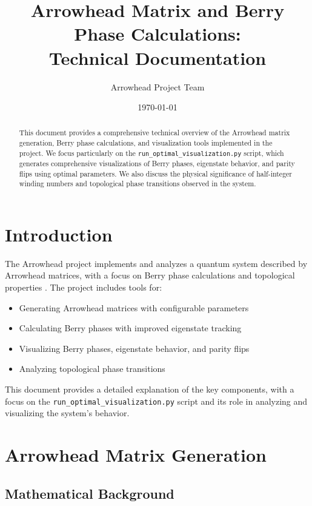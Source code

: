 \documentclass{article}
\title{Arrowhead Matrix and Berry Phase Calculations: \\
       Technical Documentation}
\author{Arrowhead Project Team}
\date{\today}
\begin{document}
\maketitle

\begin{abstract}
This document provides a comprehensive technical overview of the Arrowhead matrix generation, Berry phase calculations, and visualization tools implemented in the project. We focus particularly on the \texttt{run\_optimal\_visualization.py} script, which generates comprehensive visualizations of Berry phases, eigenstate behavior, and parity flips using optimal parameters. We also discuss the physical significance of half-integer winding numbers and topological phase transitions observed in the system.
\end{abstract}

\tableofcontents

\section{Introduction}

The Arrowhead project implements and analyzes a quantum system described by Arrowhead matrices, with a focus on Berry phase calculations and topological properties \cite{Xiao2010, Vanderbilt2018}. The project includes tools for:

\begin{itemize}
    \item Generating Arrowhead matrices with configurable parameters
    \item Calculating Berry phases with improved eigenstate tracking
    \item Visualizing Berry phases, eigenstate behavior, and parity flips
    \item Analyzing topological phase transitions
\end{itemize}

This document provides a detailed explanation of the key components, with a focus on the \texttt{run\_optimal\_visualization.py} script and its role in analyzing and visualizing the system's behavior.

\section{Arrowhead Matrix Generation}

\subsection{Mathematical Background}
\end{document}
